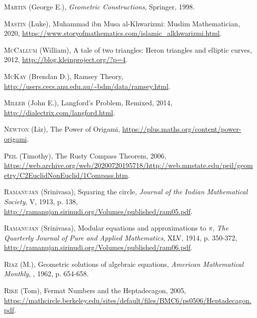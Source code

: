 \begin{thebibliography}{99}
  \textsc{Martin} (George E.), \emph{Geometric Constructions}, Springer, 1998.


  \textsc{Mastin} (Luke), \og Muhammad ibn {Musa al-Khwarizmi}: {Muslim Mathematician}\fg, 2020, \url{https://www.storyofmathematics.com/islamic_alkhwarizmi.html}.


  \textsc{McCallum} (William), \og A tale of two triangles: Heron triangles and elliptic curves\fg, 2012, \url{http://blog.kleinproject.org/?p=4}.

  \textsc{McKay} (Brendan D.), \og Ramsey Theory\fg, \url{http://users.cecs.anu.edu.au/~bdm/data/ramsey.html}.


  \textsc{Miller} (John E.), \og Langford's Problem, Remixed\fg, 2014, \url{http://dialectrix.com/langford.html}.



  \textsc{Newton} (Liz), \og The Power of Origami\fg, \url{https://plus.maths.org/content/power-origami}.


  \textsc{Peil} (Timothy), \og The Rusty Compass Theorem\fg, 2006, \url{https://web.archive.org/web/20200720195718/http://web.mnstate.edu/peil/geometry/C2EuclidNonEuclid/1Compass.htm}.
 




  \textsc{Ramanujan} (Srinivasa), \og Squaring the circle\fg, \emph{Journal of the Indian Mathematical Society}, \no V, 1913, p. 138, \url{http://ramanujan.sirinudi.org/Volumes/published/ram05.pdf}.


  \textsc{Ramanujan} (Srinivasa), \og Modular equations and approximations to $\pi$\fg, \emph{The Quarterly Journal of Pure and Applied Mathematics}, \no XLV, 1914, p. 350-372, \url{http://ramanujan.sirinudi.org/Volumes/published/ram06.pdf}.





  \textsc{Riaz} (M.), \og Geometric solutions of algebraic equations\fg, \emph{American Mathematical Monthly}, , 1962, p. 654-658.






  \textsc{Rike} (Tom), \og Fermat Numbers and the Heptadecagon\fg, 2005, \url{https://mathcircle.berkeley.edu/sites/default/files/BMC6/ps0506/Heptadecagon.pdf}.
















\end{thebibliography}
